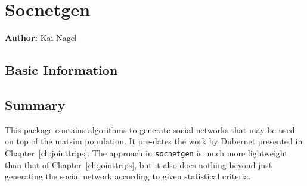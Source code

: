 \chapter{Socnetgen}
\label{sec:contrib-socnetgen}

\hfill \textbf{Author:} Kai Nagel


\section{Basic Information}

\section{Summary}
This package contains algorithms to generate social networks that may be used on top of the \gls{matsim} population.  
It pre-dates the work by Dubernet presented in Chapter~\ref{ch:jointtrips}.  
The approach in \lstinline{socnetgen} is much more lightweight than that of Chapter~\ref{ch:jointtrips}, but it also does nothing beyond just generating the social network according to given statistical criteria.


